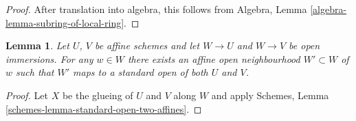 \documentclass{stacks-project}
\theoremstyle{plain}
\newtheorem{lemma}[subsection]{Lemma}
\theoremstyle{definition}
\theoremstyle{remark}
\numberwithin{equation}{subsection}
\begin{document}
\begin{proof}
After translation into algebra, this follows from
Algebra, Lemma \ref{algebra-lemma-subring-of-local-ring}.
\end{proof}

\begin{lemma}
\label{lemma-standard-open-two-affines}
Let $U$, $V$ be affine schemes and let $W \to U$ and $W \to V$
be open immersions. For any $w \in W$ there exists an affine
open neighbourhood $W' \subset W$ of $w$ such that $W'$
maps to a standard open of both $U$ and $V$.
\end{lemma}

\begin{proof}
Let $X$ be the glueing of $U$ and $V$ along $W$ and
apply Schemes, Lemma \ref{schemes-lemma-standard-open-two-affines}.
\end{proof}










\end{document}
